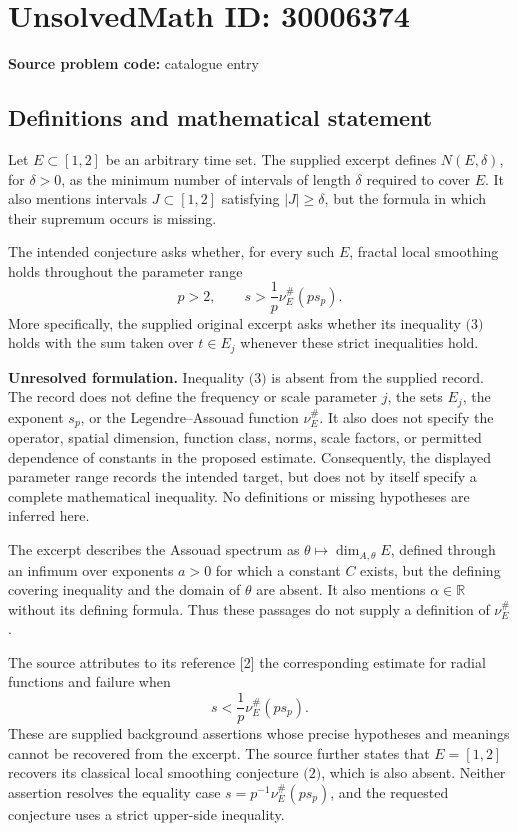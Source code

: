 \documentclass[11pt]{article}
\newcommand{\R}{\mathbb{R}}
\begin{document}
\section*{UnsolvedMath ID: 30006374}
\textbf{Source problem code:} catalogue entry
\subsection{Definitions and mathematical statement}
Let \(E\subset[1,2]\) be an arbitrary time set. The supplied excerpt defines \(N(E,\delta)\), for \(\delta>0\), as the minimum number of intervals of length \(\delta\) required to cover \(E\). It also mentions intervals \(J\subset[1,2]\) satisfying \(|J|\geq\delta\), but the formula in which their supremum occurs is missing.

The intended conjecture asks whether, for every such \(E\), fractal local smoothing holds throughout the parameter range
\[
 p>2,\qquad s>\frac{1}{p}\nu_E^{\#}(p s_p).
\]
More specifically, the supplied original excerpt asks whether its inequality \(\text{(3)}\) holds with the sum taken over \(t\in E_j\) whenever these strict inequalities hold.

\textbf{Unresolved formulation.} Inequality \(\text{(3)}\) is absent from the supplied record. The record does not define the frequency or scale parameter \(j\), the sets \(E_j\), the exponent \(s_p\), or the Legendre--Assouad function \(\nu_E^{\#}\). It also does not specify the operator, spatial dimension, function class, norms, scale factors, or permitted dependence of constants in the proposed estimate. Consequently, the displayed parameter range records the intended target, but does not by itself specify a complete mathematical inequality. No definitions or missing hypotheses are inferred here.

The excerpt describes the Assouad spectrum as \(\theta\mapsto\dim_{A,\theta}E\), defined through an infimum over exponents \(a>0\) for which a constant \(C\) exists, but the defining covering inequality and the domain of \(\theta\) are absent. It also mentions \(\alpha\in\R\) without its defining formula. Thus these passages do not supply a definition of \(\nu_E^{\#}\).

The source attributes to its reference [2] the corresponding estimate for radial functions and failure when
\[
 s<\frac{1}{p}\nu_E^{\#}(p s_p).
\]
These are supplied background assertions whose precise hypotheses and meanings cannot be recovered from the excerpt. The source further states that \(E=[1,2]\) recovers its classical local smoothing conjecture \(\text{(2)}\), which is also absent. Neither assertion resolves the equality case \(s=p^{-1}\nu_E^{\#}(p s_p)\), and the requested conjecture uses a strict upper-side inequality.
\end{document}
